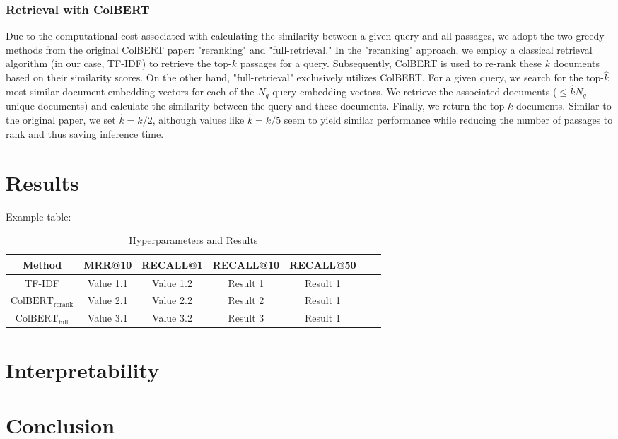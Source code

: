 \documentclass{article}
\begin{document}
\subsubsection{Retrieval with ColBERT}
Due to the computational cost associated with calculating the similarity between a given query and all passages, we adopt the two greedy methods from the original ColBERT paper: "reranking" and "full-retrieval." In the "reranking" approach, we employ a classical retrieval algorithm (in our case, TF-IDF) to retrieve the top-$k$ passages for a query. Subsequently, ColBERT is used to re-rank these $k$ documents based on their similarity scores. On the other hand, "full-retrieval" exclusively utilizes ColBERT. For a given query, we search for the top-$\hat{k}$ most similar document embedding vectors for each of the $N_q$ query embedding vectors. We retrieve the associated documents ($\leq \hat{k}N_q$ unique documents) and calculate the similarity between the query and these documents. Finally, we return the top-$k$ documents. Similar to the original paper, we set $\hat{k} = k / 2$, although values like $\hat{k} = k / 5$ seem to yield similar performance while reducing the number of passages to rank and thus saving inference time.

\section{Results}


Example table:
\begin{table}[htbp]
    \centering
    \label{tab:hyperparameters}
    \begin{tabular}{ccccccc}
      \toprule
      \textbf{Method} & \textbf{MRR@10}  & \textbf{RECALL@1} & \textbf{RECALL@10} & \textbf{RECALL@50} \\
      \midrule
      TF-IDF & Value 1.1 & Value 1.2 & Result 1  & Result 1 \\
      $\text{ColBERT}_\text{rerank}$ & Value 2.1 & Value 2.2 & Result 2 & Result 1 \\
      $\text{ColBERT}_\text{full}$ & Value 3.1 & Value 3.2 & Result 3 & Result 1 \\
      \bottomrule
    \end{tabular}
    \caption{Hyperparameters and Results}
\end{table}

\section{Interpretability}

\section{Conclusion}



\end{document}
